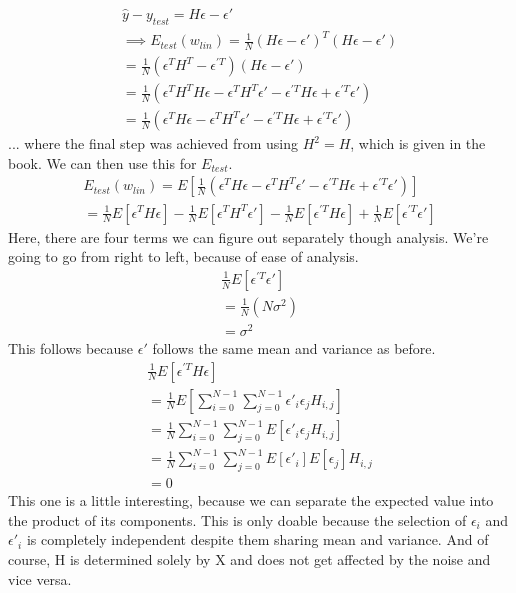 \documentclass[12pt]{article}
\begin{document}
\begin{enumerate}[label=(\alph*)]
	\begin{gather*}
		\hat{y} - y_{test} = H\epsilon - \epsilon'
		\\ \implies E_{test}(w_{lin}) = \frac{1}{N}(H\epsilon - \epsilon')^T (H\epsilon - \epsilon')
		\\ = \frac{1}{N}(\epsilon^TH^T - \epsilon^{\prime T})(H\epsilon - \epsilon')
		\\ = \frac{1}{N}(\epsilon^TH^TH\epsilon - \epsilon^TH^T\epsilon' - \epsilon^{\prime T}H\epsilon + \epsilon^{\prime T}\epsilon')
		\\ =  \frac{1}{N}(\epsilon^TH\epsilon - \epsilon^TH^T\epsilon' - \epsilon^{\prime T}H\epsilon + \epsilon^{\prime T}\epsilon')
	\end{gather*}
	... where the final step was achieved from using $H^2 = H$, which is given in the book. We can then use this for $E_{test}$.
	\begin{gather*}
		E_{test}(w_{lin}) = E[\frac{1}{N}(\epsilon^TH\epsilon - \epsilon^TH^T\epsilon' - \epsilon^{\prime T}H\epsilon + \epsilon^{\prime T}\epsilon')]
		\\ = \frac{1}{N}E[\epsilon^TH\epsilon] - \frac{1}{N}E[\epsilon^TH^T\epsilon'] - \frac{1}{N}E[\epsilon^{\prime T}H\epsilon] + \frac{1}{N}E[\epsilon^{\prime T}\epsilon']
	\end{gather*}
	Here, there are four terms we can figure out separately though analysis. We're going to go from right to left, because of ease of analysis.
	\begin{gather*}
		\frac{1}{N}E[\epsilon^{\prime T}\epsilon']
		\\ = \frac{1}{N}(N\sigma^2)
		\\ = \sigma^2
	\end{gather*}
	This follows because $\epsilon'$ follows the same mean and variance as before.
	\begin{gather*}
		\frac{1}{N}E[\epsilon^{\prime T}H\epsilon]
		\\ = \frac{1}{N}E[\sum_{i=0}^{N-1}\sum_{j=0}^{N-1}\epsilon'_i\epsilon_jH_{i,j}]
		\\ = \frac{1}{N}\sum_{i=0}^{N-1}\sum_{j=0}^{N-1}E[\epsilon'_i\epsilon_jH_{i,j}]
		\\ = \frac{1}{N}\sum_{i=0}^{N-1}\sum_{j=0}^{N-1}E[\epsilon'_i]E[\epsilon_j]H_{i,j}
		\\ = 0
	\end{gather*}
	This one is a little interesting, because we can separate the expected value into the product of its components. This is only doable because the selection of $\epsilon_i$ and $\epsilon'_i$ is completely independent despite them sharing mean and variance. And of course, H is determined solely by X and does not get affected by the noise and vice versa.

\end{enumerate}
\end{document}
